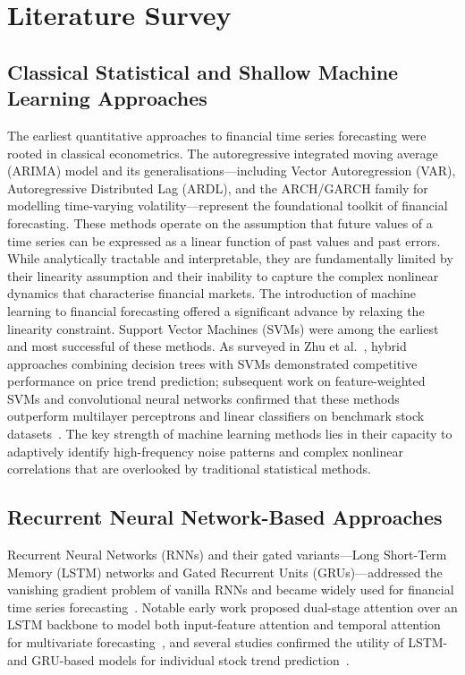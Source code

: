 \documentclass[a4paper,11pt]{report}
\begin{document}
\chapter{Literature Survey}
\label{ch:LiteratureSurvey}

\section{Classical Statistical and Shallow Machine Learning Approaches}
\label{sec:classical}

The earliest quantitative approaches to financial time series forecasting were rooted in classical econometrics. The autoregressive integrated moving average (ARIMA) model and its generalisations---including Vector Autoregression (VAR), Autoregressive Distributed Lag (ARDL), and the ARCH/GARCH family for modelling time-varying volatility---represent the foundational toolkit of financial forecasting. These methods operate on the assumption that future values of a time series can be expressed as a linear function of past values and past errors. While analytically tractable and interpretable, they are fundamentally limited by their linearity assumption and their inability to capture the complex nonlinear dynamics that characterise financial markets.
The introduction of machine learning to financial forecasting offered a significant advance by relaxing the linearity constraint. Support Vector Machines (SVMs) were among the earliest and most successful of these methods. As surveyed in Zhu et al.~\cite{zhu2025msgformer}, hybrid approaches combining decision trees with SVMs demonstrated competitive performance on price trend prediction; subsequent work on feature-weighted SVMs and convolutional neural networks confirmed that these methods outperform multilayer perceptrons and linear classifiers on benchmark stock datasets~\cite{zhu2025msgformer}. The key strength of machine learning methods lies in their capacity to adaptively identify high-frequency noise patterns and complex nonlinear correlations that are overlooked by traditional statistical methods.
\section{Recurrent Neural Network-Based Approaches}
\label{sec:rnn}

Recurrent Neural Networks (RNNs) and their gated variants---Long Short-Term Memory (LSTM) networks and Gated Recurrent Units (GRUs)---addressed the vanishing gradient problem of vanilla RNNs and became widely used for financial time series forecasting~\cite{zhu2025msgformer}. Notable early work proposed dual-stage attention over an LSTM backbone to model both input-feature attention and temporal attention for multivariate forecasting~\cite{zhu2025msgformer}, and several studies confirmed the utility of LSTM- and GRU-based models for individual stock trend prediction~\cite{xiang2022thgnn,liao2024dhstn}.
\end{document}
